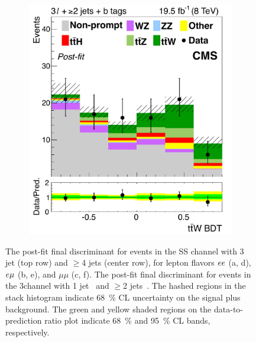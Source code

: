 \begin{figure}[tb]
\begin{subfigure}{0.33\textwidth}
    \caption{}
    \label{sfig:8-ttW-bl}
  \end{subfigure}
  \begin{subfigure}{0.33\textwidth}
    \includegraphics[width=\textwidth]{figures/eight-TeV/mva/3l_ge2j_bloose_FinalBDT}
    \caption{}
    \label{sfig:8-ttW-br}
  \end{subfigure}
  \vspace{-1cm}
  \caption[Final discriminant for events in the \ttW channel]{
    The post-fit final discriminant for events in the SS \ttW channel with 3 jet (top row) and
    $\geq$4 jets (center row), for lepton flavors $ee$ (a, d), $e\mu$ (b, e), and $\mu\mu$ (c,
    f). The post-fit final discriminant for events in the 3\lep \ttW channel with 1
    jet~ and $\geq$2 jets~. The hashed regions in the
    stack histogram indicate \SI{68}{\percent} CL uncertainty on the signal plus background. The
    green and yellow shaded regions on the data-to-prediction ratio plot indicate \SI{68}{\percent}
    and \SI{95}{\percent} CL bands, respectively.
  }
  \label{fig:8-postfit-bdt-ttW}
\end{figure}
